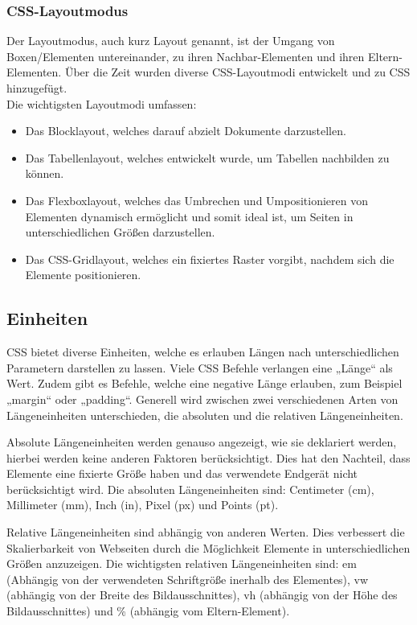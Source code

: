 \subsubsection{CSS-Layoutmodus}
Der Layoutmodus, auch kurz Layout genannt, ist der Umgang von Boxen/Elementen untereinander, zu ihren Nachbar-Elementen und ihren Eltern-Elementen. Über die Zeit wurden diverse CSS-Layoutmodi entwickelt und zu CSS hinzugefügt.\\
Die wichtigsten Layoutmodi umfassen: \\
\begin{itemize}
\item Das Blocklayout, welches darauf abzielt Dokumente darzustellen.
\item Das Tabellenlayout, welches entwickelt wurde, um Tabellen nachbilden zu können.
\item Das Flexboxlayout, welches das Umbrechen und Umpositionieren von Elementen dynamisch ermöglicht und somit ideal ist, um Seiten in unterschiedlichen Größen darzustellen.
\item Das CSS-Gridlayout, welches ein fixiertes Raster vorgibt, nachdem sich die Elemente positionieren.
\end{itemize}

\subsection{Einheiten}
CSS bietet diverse Einheiten\cite{Einheiten}, welche es erlauben Längen nach unterschiedlichen Parametern darstellen zu lassen. Viele CSS Befehle verlangen eine „Länge“ als Wert. Zudem gibt es Befehle, welche eine negative Länge erlauben, zum Beispiel „margin“ oder „padding“. Generell wird zwischen zwei verschiedenen Arten von Längeneinheiten unterschieden, die absoluten und die relativen Längeneinheiten.

Absolute Längeneinheiten werden genauso angezeigt, wie sie deklariert werden, hierbei werden keine anderen Faktoren berücksichtigt. Dies hat den Nachteil, dass Elemente eine fixierte Größe haben und das verwendete Endgerät nicht berücksichtigt wird. Die absoluten Längeneinheiten sind: Centimeter (cm), Millimeter (mm), Inch (in), Pixel (px) und Points (pt).

Relative Längeneinheiten sind abhängig von anderen Werten. Dies verbessert die Skalierbarkeit von Webseiten durch die Möglichkeit Elemente in unterschiedlichen Größen anzuzeigen. Die wichtigsten relativen Längeneinheiten sind: em (Abhängig von der verwendeten Schriftgröße inerhalb des Elementes), vw (abhängig von der Breite des Bildausschnittes), vh (abhängig von der Höhe des Bildausschnittes) und \% (abhängig vom Eltern-Element).


